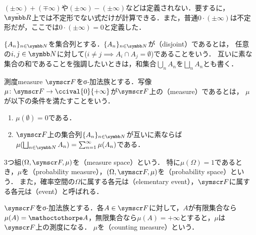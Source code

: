 \documentclass[../../main]{subfiles}
\begin{document}
\begin{note}
  \((\pm\infty)+(\mp\infty)\)や\((\pm\infty)-(\pm\infty)\)などは定義されない．要するに，\(\extendedreal\)上では不定形でない式だけが計算できる．また，普通\(0\cdot(\pm\infty)\)は不定形だが，ここでは\(0\cdot(\pm\infty)=0\)と定義した．
\end{note}

\(\seq{A_n}_{n\in\numset{N}}\)を集合列とする．\(\seq{A_n}_{n\in\numset{N}}\)が（disjoint）であるとは，
任意の\(i,j\in\numset{N}\)に対して(\(i\neq j\implies A_i\cap A_j=\emptyset\))であることをいう．
互いに素な集合の和であることを強調したいときは，和集合\(\bigcup_nA_n\)を\(\bigsqcup_nA_n\)とも書く．

\begin{definition}{測度}{measure}
  \(\sigmaalg{F}\)をσ‐加法族とする．写像\(\mu\colon\sigmaalg{F}\to\ccival{0}{+\infty}\)が\(\sigmaalg{F}\)上の（measure）であるとは，
  \(\mu\)が以下の条件を満たすことをいう．
  \begin{enumerate}
    \item \(\mu(\emptyset)=0\)である．
    \item \(\sigmaalg{F}\)上の集合列\(\seq{A_n}_{n\in\numset{N}}\)が互いに素ならば\(\mu(\bigsqcup_{n\in\numset{N}}A_n)=\sum_{n=1}^\infty\mu(A_n)\)である．
  \end{enumerate}
\end{definition}

3つ組\((\Omega,\sigmaalg{F},\mu)\)を（measure space）という．
特に\(\mu(\Omega)=1\)であるとき，\(\mu\)を（probability measure），\((\Omega,\sigmaalg{F},\mu)\)を（probability space）という．
また，確率空間の\(\Omega\)に属する各元は（elementary event），\(\sigmaalg{F}\)に属する各元は（event）と呼ばれる．

\begin{example}[計数測度]
  \(\sigmaalg{F}\)をσ‐加法族とする．各\(A\in\sigmaalg{F}\)に対して，\(A\)が有限集合なら\(\mu(A)=\sizeof{A}\)，無限集合なら\(\mu(A)=+\infty\)とすると，\(\mu\)は\(\sigmaalg{F}\)上の測度になる．
  \(\mu\)を（counting measure）という．
\end{example}
\end{document}
